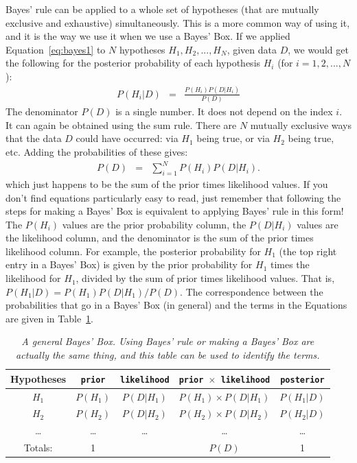 Bayes' rule can be applied to a whole set
of hypotheses (that are mutually exclusive and exhaustive) simultaneously.
This is a more common way of using it, and it is the way we use it when we use
a Bayes' Box. If we applied Equation~\ref{eq:bayes1} to $N$ hypotheses
$H_1, H_2, ..., H_N$, given data $D$, we would get the following for the posterior
probability of each hypothesis $H_i$ (for $i=1, 2, ..., N$):
\begin{eqnarray}
P(H_i|D) &=& \frac{P(H_i)P(D|H_i)}{P(D)}
\end{eqnarray}
The denominator $P(D)$ is a single number. It does not depend on the index $i$.
It can again be obtained using the sum rule. There are $N$
mutually exclusive ways that the data $D$ could have occurred: via $H_1$ being
true, or via $H_2$ being true, etc. Adding the probabilities of these gives:
\begin{eqnarray}
P(D) &=& \sum_{i=1}^N P(H_i)P(D|H_i).
\end{eqnarray}
which just happens to be the sum of the prior times likelihood values.
If you don't find equations particularly easy to read, just remember that
following the steps for making a Bayes' Box is equivalent to applying
Bayes' rule in this form! The $P(H_i)$ values are the prior probability column, the
$P(D|H_i)$ values are the likelihood column, and the denominator is the
sum of the prior times likelihood column. For example, the posterior probability
for $H_1$ (the top right entry in a Bayes' Box) is given by the prior probability
for $H_1$ times the likelihood for $H_1$, divided by the sum of prior times
likelihood values. That is, $P(H_1|D) = P(H_1)P(D|H_1)/P(D)$.
The correspondence between the probabilities that go in a Bayes'
Box (in general) and the terms in the Equations are given in
Table~\ref{tab:general_bayes_box}.

\begin{table}[ht!]
\begin{center}
\begin{tabular}{|c|c|c|c|c|}
\hline
{\bf Hypotheses} & {\tt prior} & {\tt likelihood} &
{\tt prior $\times$ likelihood} & {\tt posterior}\\
\hline
$H_1$ & $P(H_1)$ & $P(D|H_1)$ & $P(H_1)\times P(D|H_1)$ & $P(H_1|D)$\\
$H_2$ & $P(H_2)$ & $P(D|H_2)$ & $P(H_2)\times P(D|H_2)$ & $P(H_2|D)$\\
\ldots & \ldots & \ldots & \ldots & \ldots\\
\hline
Totals: & 1 & & $P(D)$ & 1\\
\hline
\end{tabular}
\caption{\it A general Bayes' Box. Using Bayes' rule or making a Bayes' Box are
actually the same thing, and this table can be used to identify the
terms.\label{tab:general_bayes_box}}
\end{center}
\end{table}

